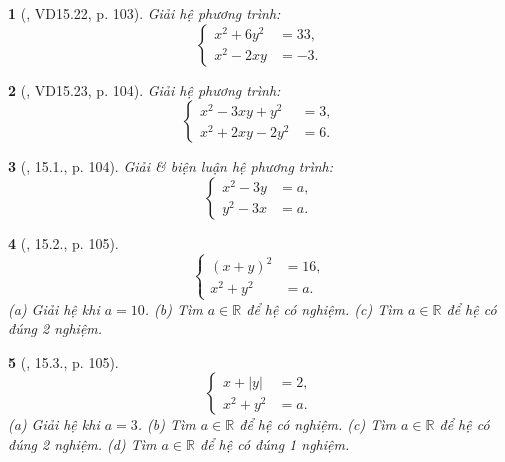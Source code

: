 \documentclass{article}
\newtheorem{baitoan}{}
\begin{document}
\begin{baitoan}[\cite{TLCT_THCS_Toan_9_dai_so}, VD15.22, p. 103]
	Giải hệ phương trình:
	\begin{equation*}
		\left\{\begin{split}
			x^2 + 6y^2 &= 33,\\
			x^2 - 2xy &= -3.
		\end{split}\right.
	\end{equation*}
\end{baitoan}

\begin{baitoan}[\cite{TLCT_THCS_Toan_9_dai_so}, VD15.23, p. 104]
	Giải hệ phương trình:
	\begin{equation*}
		\left\{\begin{split}
			x^2 - 3xy + y^2 &= 3,\\
			x^2 + 2xy - 2y^2 &= 6.
		\end{split}\right.
	\end{equation*}
\end{baitoan}

\begin{baitoan}[\cite{TLCT_THCS_Toan_9_dai_so}, 15.1., p. 104]
	Giải \& biện luận hệ phương trình:
	\begin{equation*}
		\left\{\begin{split}
			x^2 - 3y &= a,\\
			y^2 - 3x &= a.
		\end{split}\right.
	\end{equation*}
\end{baitoan}

\begin{baitoan}[\cite{TLCT_THCS_Toan_9_dai_so}, 15.2., p. 105]
	\begin{equation*}
		\left\{\begin{split}
			(x + y)^2 &= 16,\\
			x^2 + y^2 &= a.
		\end{split}\right.
	\end{equation*}
	(a) Giải hệ khi $a = 10$. (b) Tìm $a\in\mathbb{R}$ để hệ có nghiệm. (c) Tìm $a\in\mathbb{R}$ để hệ có đúng 2 nghiệm.
\end{baitoan}

\begin{baitoan}[\cite{TLCT_THCS_Toan_9_dai_so}, 15.3., p. 105]
	\begin{equation*}
		\left\{\begin{split}
			x + |y| &= 2,\\
			x^2 + y^2 &= a.
		\end{split}\right.
	\end{equation*}
	(a) Giải hệ khi $a = 3$. (b) Tìm $a\in\mathbb{R}$ để hệ có nghiệm. (c) Tìm $a\in\mathbb{R}$ để hệ có đúng 2 nghiệm. (d) Tìm $a\in\mathbb{R}$ để hệ có đúng 1 nghiệm.
\end{baitoan}
\end{document}
